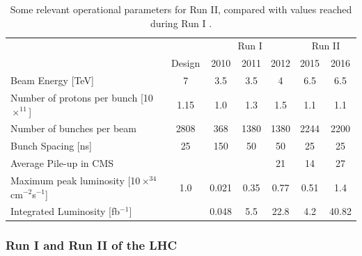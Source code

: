  
\begin{table}[ht]
\begin{center}
\begin{tabular}{|l|c|c|c|c|c|c|} \hline \hline
                                                     &                &                 \multicolumn{3}{|c|}{Run I}            &  \multicolumn{2}{|c|}{Run II}        \\    \cline{3-7}
                                                     &     Design     &       2010      &       2011       &       2012        &       2015       &       2016        \\     \hline \hline   
   Beam Energy [TeV]                                 &        7       &       3.5       &        3.5       &          4        &        6.5       &        6.5        \\ 
   Number of protons per bunch [10$\times^{11}$]     &      1.15      &       1.0       &        1.3       &        1.5        &        1.1       &        1.1        \\
   Number of bunches per beam                        &      2808      &       368       &       1380       &       1380        &       2244       &       2200        \\
   Bunch Spacing [ns]                                &        25      &       150       &         50       &         50        &         25       &        25         \\
   Average Pile-up in CMS                            &                &                 &                  &         21        &         14       &        27        \\
   Maximum peak luminosity [10$\times^{34}$ cm$^{-2}$s$^{-1}$] & 1.0  &       0.021     &        0.35      &         0.77      &        0.51      &       1.4        \\
   Integrated Luminosity [fb$^{-1}$]                 &                &       0.048     &         5.5      &         22.8      &         4.2      &       40.82       \\  \hline \hline
\end{tabular}
\end{center}
\caption{Some relevant operational parameters for Run II, compared with values reached during Run I \cite{chp2:LHCparameters}.}\label{chp2:LHCtable}
\end{table}

\subsubsection{Run I and Run II of the LHC}
\label{subsubsec:LHCruns}

